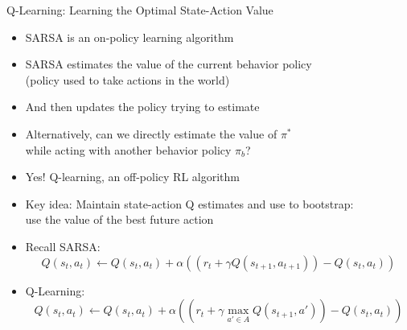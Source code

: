 \documentclass[aspectratio=169]{../latex_main/tntbeamer}  %
\begin{document}
\begin{frame}[c]{Q-Learning: Learning the Optimal State-Action Value}
	
	\vspace{-1em}
	\begin{itemize}
		\item SARSA is an on-policy learning algorithm
		\item SARSA estimates the value of the current behavior policy\\ (policy
		used to take actions in the world)
		\item And then updates the policy trying to estimate
		\pause
		\medskip
		\item Alternatively, can we directly estimate the value of $\pi^*$\\ while acting with another behavior policy $\pi_b$?
		\item Yes! Q-learning, an off-policy RL algorithm
		\item Key idea: Maintain state-action Q estimates and use to bootstrap:\\
		use the value of the best future action
		\item Recall SARSA:
		$$ Q(s_t, a_t) \gets Q(s_t, a_t) + \alpha((r_t + \gamma Q(s_{t+1}, a_{t+1})) - Q(s_t, a_t))$$
		\item Q-Learning:
		$$Q(s_t, a_t) \gets Q(s_t, a_t) + \alpha((r_t + \gamma \max_{a' \in A}Q(s_{t+1},a')) - Q(s_t, a_t)) $$
	\end{itemize}
	
\end{frame}
	
	
\end{document}
